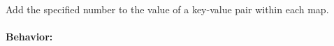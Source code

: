 Add the specified number to the value of a key-value pair within each map.

\paragraph{Behavior:}
\begin{itemize}[noitemsep]


\end{itemize}
